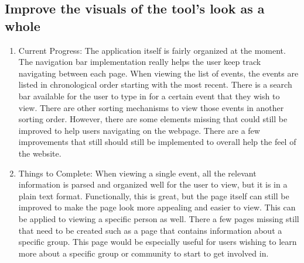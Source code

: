 \documentclass[letterpaper,10pt,onecolumn]{IEEEtran} %
\begin{document}
\subsection{Improve the visuals of the tool's look as a whole}
\begin{enumerate}[label*=\arabic*.]
\item Current Progress: The application itself is fairly organized at the moment. The navigation bar implementation really helps the user keep track navigating between each page. When viewing the list of events, the events are listed in chronological order starting with the most recent. There is a search bar available for the user to type in for a certain event that they wish to view. There are other sorting mechanisms to view those events in another sorting order. However, there are some elements missing that could still be improved to help users navigating on the webpage. There are a few improvements that still should still be implemented to overall help the feel of the website.

\item Things to Complete: When viewing a single event, all the relevant information is parsed and organized well for the user to view, but it is in a plain text format. Functionally, this is great, but the page itself can still be improved to make the page look more appealing and easier to view. This can be applied to viewing a specific person as well. There a few pages missing still that need to be created such as a page that contains information about a specific group. This page would be especially useful for users wishing to learn more about a specific group or community to start to get involved in.
\end{enumerate}
\end{document}
